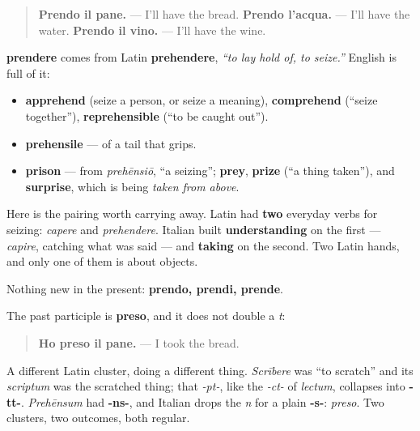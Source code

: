 \begin{quote}
\textbf{Prendo il pane.} — I'll have the bread. \textbf{Prendo l'acqua.} — I'll have the water. \textbf{Prendo il vino.} — I'll have the wine.
\end{quote}

\begin{cousinweb}
\textbf{prendere} comes from Latin \textbf{prehendere}, \emph{\textquotedblleft{}to lay hold of, to seize.\textquotedblright{}} English is full of it:

\begin{itemize}
\raggedright
  \item \textbf{apprehend} (seize a person, or seize a meaning), \textbf{comprehend} (\textquotedblleft{}seize together\textquotedblright{}), \textbf{reprehensible} (\textquotedblleft{}to be caught out\textquotedblright{}).
  \item \textbf{prehensile} — of a tail that grips.
  \item \textbf{prison} — from \emph{prehēnsiō}, \textquotedblleft{}a seizing\textquotedblright{}; \textbf{prey}, \textbf{prize} (\textquotedblleft{}a thing taken\textquotedblright{}), and \textbf{surprise}, which is being \emph{taken from above}.
\end{itemize}

Here is the pairing worth carrying away. Latin had \textbf{two} everyday verbs for seizing: \emph{capere} and \emph{prehendere}. Italian built \textbf{understanding} on the first — \emph{capire}, catching what was said — and \textbf{taking} on the second. Two Latin hands, and only one of them is about objects.
\end{cousinweb}

\begin{grammarlens}[title={Grammar Lens: the -ere present, and a participle that goes its own way}]
Nothing new in the present: \textbf{prendo, prendi, prende}.

The past participle is \textbf{preso}, and it does not double a \emph{t}:

\begin{quote}
\textbf{Ho preso il pane.} — I took the bread.
\end{quote}

A different Latin cluster, doing a different thing. \emph{Scrībere} was \textquotedblleft{}to scratch\textquotedblright{} and its \emph{scriptum} was the scratched thing; that \emph{-pt-}, like the \emph{-ct-} of \emph{lectum}, collapses into \textbf{-tt-}. \emph{Prehēnsum} had \textbf{-ns-}, and Italian drops the \emph{n} for a plain \textbf{-s-}: \emph{preso}. Two clusters, two outcomes, both regular.
\end{grammarlens}

